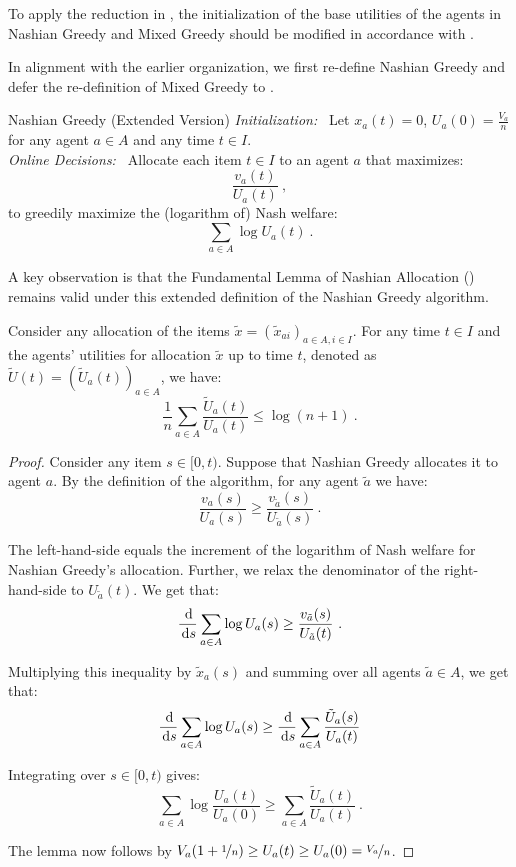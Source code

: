 \documentclass[11pt,letterpaper]{article}
\newcommand{\dif}[1]{\,\text{\rm d} #1}
\newcommand{\utility}{U}
\begin{document}
To apply the reduction in , the initialization of the base utilities of the agents in Nashian Greedy and Mixed Greedy should be modified in accordance with .

In alignment with the earlier organization, we first re-define Nashian Greedy and defer the re-definition of Mixed Greedy to .

\begin{algorithm}{Nashian Greedy (Extended Version)}
	\emph{Initialization:~}
	Let $x_a(t) = 0$, $\utility_a(0) = \frac{V_a}{n}$ for any agent $a \in A$ and any time $t \in I$.\\[2ex]
	\emph{Online Decisions:~}
	Allocate each item $t \in I$ to an agent $a$ that maximizes:
	\[
	\frac{v_a(t)}{\utility_a(t)}
	~,
	\]
	to greedily maximize the (logarithm of) Nash welfare:
	\[
	\sum_{a \in A} \log \utility_a(t)
	~.
	\]
\end{algorithm}

A key observation is that the Fundamental Lemma of Nashian Allocation () remains valid under this extended definition of the Nashian Greedy algorithm.


\begin{lemma}
	\label{lem:nashian-app}
	Consider any allocation of the items $\tilde{x} = (\tilde{x}_{ai})_{a \in A, i \in I}$.
	For any time $t \in I$ and the agents' utilities for allocation $\tilde{x}$ up to time $t$, denoted as $\tilde{\utility}(t) = (\tilde{\utility}_a(t))_{a \in A}$, we have:
	\[
	\frac{1}{n} \sum_{a \in A} \frac{\tilde{\utility}_a(t)}{\utility_a(t)} \le \log (n+1)
	~.
	\]
\end{lemma}

\begin{proof}
	Consider any item $s \in [0, t)$.
	Suppose that Nashian Greedy allocates it to agent $a$.
	By the definition of the algorithm, for any agent $\tilde{a}$ we have:
	\[
	\frac{v_a(s)}{\utility_a(s)} \ge \frac{v_{\tilde{a}}(s)}{\utility_{\tilde{a}}(s)}
	~.
	\]
	
	The left-hand-side equals the increment of the logarithm of Nash  welfare for Nashian Greedy's allocation.
	Further, we relax the denominator of the right-hand-side to $U_{\tilde{a}}(t)$.
	We get that:
	\[
	\frac{\dif}{\dif{s}} \sum_{a \in A} \log \utility_a(s) \ge \frac{v_{\tilde{a}}(s)}{\utility_{\tilde{a}}(t)}
	~.
	\]
	
	Multiplying this inequality by $\tilde{x}_a(s)$ and summing over all agents $\tilde{a} \in A$, we get that:
	\[
	\frac{\dif}{\dif{s}} \sum_{a \in A} \log \utility_a(s)  \ge \frac{\dif}{\dif{s}} \sum_{a\in A} \frac{\tilde{\utility}_a(s)}{\utility_a(t)}
	\]
	
	Integrating over $s \in [0, t)$ gives:
	\[
	\sum_{a \in A} \log \frac{\utility_a(t)}{\utility_a(0)} \ge \sum_{a \in A} \frac{\tilde{\utility}_a(t)}{\utility_a(t)} 
	~.
	\]
	
	The lemma now follows by $V_a(1+\nicefrac{1}{n}) \ge \utility_a(t) \ge \utility_a(0) = \nicefrac{V_a}{n}$.
\end{proof}
\end{document}
